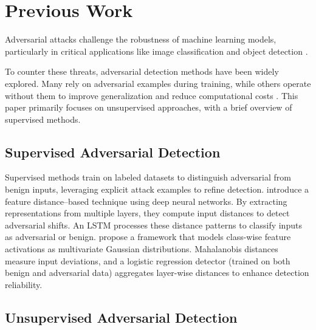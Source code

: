 \section{Previous Work}
\label{sec:previous_work}

Adversarial attacks challenge the robustness of machine learning models, particularly in critical applications like image classification and object detection \citep{finlayson2019adversarial,guo2019simple,lapid2022evolutionary,alter2024robustness,carlini2017towards,lapid2023patch,lapid2023see,lapid2024open,carlini2017adversarial,vitracktamam2023foiling}.

To counter these threats, adversarial detection methods have been widely explored. Many rely on adversarial examples during training, while others operate without them to improve generalization and reduce computational costs \citep{roth2019odds,li2017adversarial,dathathri2018detecting,ma2018characterizing,carrara2017detecting,metzen2022detecting}. This paper primarily focuses on unsupervised approaches, with a brief overview of supervised methods.

\subsection{Supervised Adversarial Detection}
\label{subsec:previous_supervised}

Supervised methods train on labeled datasets to distinguish adversarial from benign inputs, leveraging explicit attack examples to refine detection.  \citet{carrara2018adversarial} introduce a feature distance–based technique using deep neural networks. By extracting representations from multiple layers, they compute input distances to detect adversarial shifts. An LSTM \citep{graves2012long} processes these distance patterns to classify inputs as adversarial or benign. \citet{lee2018simple} propose a framework that models class-wise feature activations as multivariate Gaussian distributions. Mahalanobis distances measure input deviations, and a logistic regression detector (trained on both benign and adversarial data) aggregates layer-wise distances to enhance detection reliability.

\subsection{Unsupervised Adversarial Detection}
\label{subsec:previous_unsupervised}

